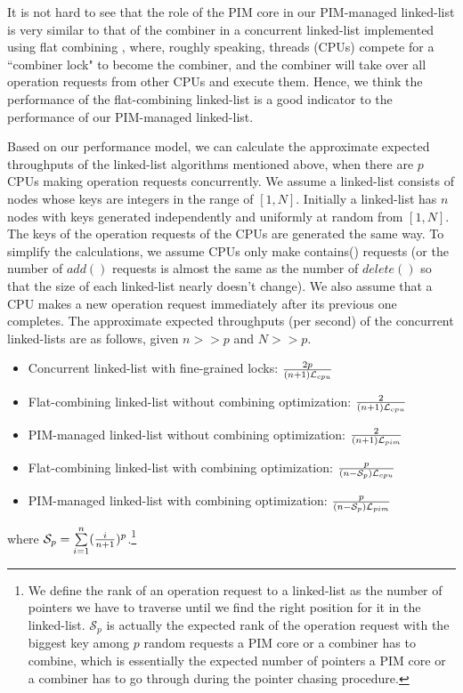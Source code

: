 \documentclass[11pt, letterpaper]{article}   	%
\newcommand{\latpim} {\mathcal{L}_{pim}}
\newcommand{\latcpu} {\mathcal{L}_{cpu}}
\newcommand{\Sp}{\mathcal{S}_{p}}
\begin{document}
It is not hard to see that the role of the PIM core in our PIM-managed linked-list
is very similar to that of the combiner in a concurrent linked-list implemented
using flat combining \cite{Hendler10}, where, roughly speaking,
threads (CPUs) compete for a ``combiner lock" to become the combiner, and
the combiner will take over all operation requests from other CPUs and execute them.
Hence, we think the performance of the flat-combining linked-list is a good indicator to
the performance of our PIM-managed linked-list.

Based on our performance model, we can calculate the approximate expected
throughputs of the linked-list algorithms mentioned above, 
when there are $p$ CPUs making operation requests concurrently.
We assume a linked-list consists of nodes whose keys are integers in the range of $[1, N]$.
Initially a linked-list has $n$ nodes with keys generated independently
and uniformly at random from $[1, N]$.
The keys of the operation requests of the CPUs are generated the same way.
To simplify the calculations, we assume CPUs only make contains() requests
(or the number of $add()$ requests is almost the same as the number of $delete()$
so that the size of each linked-list nearly doesn't change).
We also assume that a CPU makes a new operation request immediately after
its previous one completes.
The approximate expected throughputs (per second) of the concurrent linked-lists
are as follows, given $n >> p$ and $N >> p$.

\begin{itemize}
\item Concurrent linked-list with fine-grained locks:
	${2p \over (n+1)\latcpu}$

\item Flat-combining linked-list without combining optimization:
	${2 \over (n+1)\latcpu}$

\item PIM-managed linked-list without combining optimization:
	${2 \over (n+1)\latpim}$

\item Flat-combining linked-list with combining optimization:
    ${p \over (n-\Sp)\latcpu}$

\item PIM-managed linked-list with combining optimization:
    ${p \over (n-\Sp)\latpim}$
\end{itemize}

where $\Sp = \sum\limits_{i=1}^{n} ({i \over n+1})^{p}$.\footnote {
We define the rank of an operation request to a linked-list as the number of pointers
we have to traverse until we find the right position for it in the linked-list.
$\Sp$ is actually the expected rank of the operation request with the biggest key
among $p$ random requests a PIM core or a combiner has to combine,
which is essentially the expected number of pointers a PIM core or a combiner
has to go through during the pointer chasing procedure.}
\end{document}
